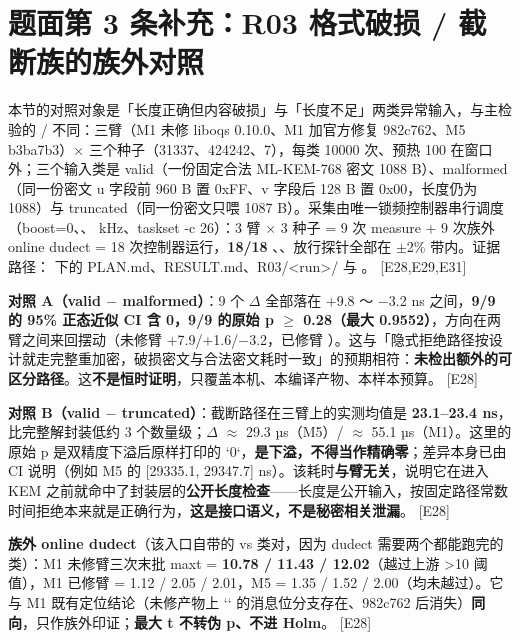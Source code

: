 \documentclass[UTF8,fontset=fandol,11pt,a4paper]{ctexart}
\begin{document}
\section{题面第 3 条补充：R03 格式破损 / 截断族的族外对照}
本节的对照对象是「长度正确但内容破损」与「长度不足」两类异常输入，与主检验的 \texttt{} / \texttt{} 不同：三臂（M1 未修 liboqs 0.10.0、M1 加官方修复 982c762、M5 \texttt{} b3ba7b3）\texorpdfstring{$\times$}{x} 三个种子（31337、424242、7），每类 10000 次、预热 100 在窗口外；三个输入类是 valid（一份固定合法 ML-KEM-768 密文 1088 B）、malformed（同一份密文 u 字段前 960 B 置 0xFF、v 字段后 128 B 置 0x00，长度仍为 1088）与 truncated（同一份密文只喂 1087 B）。采集由唯一锁频控制器串行调度（boost=0、\texttt{}、\texttt{} kHz、taskset -c 2\textbar{}6）：3 臂 \texorpdfstring{$\times$}{x} 3 种子 = 9 次 measure + 9 次族外 online dudect = 18 次控制器运行，\textbf{18/18 \texttt{}}、\texttt{}、放行探针全部在 \texorpdfstring{$\pm$}{+-}2\% 带内。证据路径：\texttt{} 下的 PLAN.md、RESULT.md、R03/<run>/ 与 \texttt{}。 [E28,E29,E31]


\textbf{对照 A（valid \texorpdfstring{$-$}{-} malformed）}：9 个 \texorpdfstring{$\Delta$}{Delta} 全部落在 +9.8 ～ \texorpdfstring{$-$}{-}3.2 ns 之间，\textbf{9/9 的 95\% 正态近似 CI 含 0，9/9 的原始 p \texorpdfstring{$\ge$}{>=} 0.28（最大 0.9552）}，方向在两臂之间来回摆动（未修臂 +7.9/+1.6/\texorpdfstring{$-$}{-}3.2，已修臂 \texttt{}）。这与「隐式拒绝路径按设计就走完整重加密，破损密文与合法密文耗时一致」的预期相符：\textbf{未检出额外的可区分路径}。这\textbf{不是恒时证明}，只覆盖本机、本编译产物、本样本预算。 [E28]


\textbf{对照 B（valid \texorpdfstring{$-$}{-} truncated）}：截断路径在三臂上的实测均值是 \textbf{23.1–23.4 ns}，比完整解封装低约 3 个数量级；\texorpdfstring{$\Delta$}{Delta} \texorpdfstring{$\approx$}{~=} 29.3 µs（M5）/ \texorpdfstring{$\approx$}{~=} 55.1 µs（M1）。这里的原始 p 是双精度下溢后原样打印的 `0`，\textbf{是下溢，不得当作精确零}；差异本身已由 CI 说明（例如 M5 的 [29335.1, 29347.7] ns）。该耗时\textbf{与臂无关}，说明它在进入 KEM 之前就命中了封装层的\textbf{公开长度检查}——长度是公开输入，按固定路径常数时间拒绝本来就是正确行为，\textbf{这是接口语义，不是秘密相关泄漏}。 [E28]


\textbf{族外 online dudect}（该入口自带的 \texttt{} vs \texttt{} 类对，因为 dudect 需要两个都能跑完的类）：M1 未修臂三次末批 max\textbar{}t\textbar{} = \textbf{10.78 / 11.43 / 12.02}（越过上游 >10 阈值），M1 已修臂 = 1.12 / 2.05 / 2.01，M5 = 1.35 / 1.52 / 2.00（均未越过）。它与 M1 既有定位结论（未修产物上 `\texttt{}` 的消息位分支存在、982c762 后消失）\textbf{同向}，只作族外印证；\textbf{最大 t 不转伪 p、不进 Holm}。 [E28]
\end{document}
